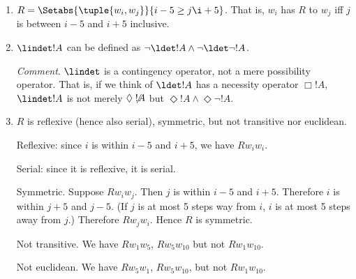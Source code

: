\documentclass[../../../../include/open-logic-section]{subfiles}
\begin{document}
\begin{prob}
	\begin{ans}
	\begin{enumerate}
	\item $R=\Setabs{\tuple{w_i,w_j}}{i-5\geq j \i+5}$. That is, $w_i$ 
	has $R$ to $w_j$ iff $j$ is between $i-5$ and $i+5$ inclusive. 
	\item $\lindet!A$ can be defined as
	$\lnot\ldet!A\land\lnot\ldet\lnot!A$. 
	
	\emph{Comment}. $\lindet$ is a contingency operator, not a mere 
	possibility operator. That is, if we think of $\ldet!A$ has a 
	necessity operator $\Box!A$, $\lindet!A$ is not merely $\Diamond\not!A$
	but $\Diamond!A\land\Diamond\lnot!A$. 
	
	\item $R$ is reflexive (hence also serial), symmetric, but not transitive
	nor euclidean. 

	Reflexive: since $i$ is within $i-5$ and $i+5$, we have $Rw_iw_i$.

	Serial: since it is reflexive, it is serial. 

	Symmetric. Suppose $Rw_iw_j$. Then $j$ is within $i-5$ and $i+5$.
	Therefore $i$ is within $j+5$ and $j-5$. (If $j$ is at most 5 steps
	way from $i$, $i$ is at most 5 steps away from $j$.) Therefore 
	$Rw_jw_i$. Hence $R$ is symmetric.

	Not transitive. We have $Rw_1w_5$, $Rw_5w_{10}$ but not 
	$Rw_1w_{10}$.

	Not euclidean. We have $Rw_5w_1$, $Rw_5w_{10}$, but not 
	$Rw_1w_{10}$.
	

\end{enumerate}
\end{ans}
\end{prob}
\end{document}
